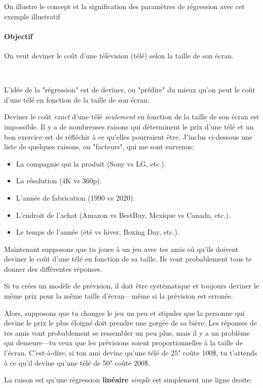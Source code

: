 \documentclass[10pt, french]{article}
\begin{document}
\begin{multicols*}{2}
On illustre le concept et la signification des paramètres de régression avec cet exemple illustratif

\paragraph{Objectif}	On veut deviner le coût d'une télévision (télé) selon la taille de son écran.

\

L'idée de la "régression" est de deviner, ou "prédire" du mieux qu'on peut le coût d'une télé en fonction de la taille de son écran.

Deviner le coût \textit{exact} d'une télé \textit{seulement} en fonction de la taille de son écran est impossible. Il y a de nombreuses raisons qui déterminent le prix d'une télé et un bon exercice est de réfléchir à ce qu'elles pourraient être. 
J'inclus ci-dessous une liste de quelques raisons, ou "facteurs", qui me sont survenus:
\begin{itemize}[leftmargin = *]
	\item	La compagnie qui la produit (Sony vs LG, etc.).
	\item	La résolution (4K vs 360p).
	\item	L'année de fabrication (1990 vs 2020).
	\item	L'endroit de l'achat (Amazon vs BestBuy, Mexique vs Canada, etc.).
	\item	Le temps de l'année (été vs hiver, Boxing Day, etc.).
\end{itemize}

Maintenant supposons que tu joues à un jeu avec tes amis où qu'ils doivent deviner le coût d'une télé en fonction de sa taille. Ils vont probablement tous te donner des différentes réponses.

Si tu crées un modèle de prévision, il doit être systématique et toujours deviner le même prix pour la même taille d'écran---même si la prévision est erronée. 

Alors, supposons que tu changes le jeu un peu et stipules que la personne qui devine le prix le plus éloigné doit prendre une gorgée de sa bière. Les réponses de tes amis vont probablement se ressembler un peu plus, mais il y a un problème qui demeure---tu veux que les prévisions soient proportionnelles à la taille de l'écran. C'est-à-dire, si ton ami devine qu'une télé de 25" coûte 100\$, tu t'attends à ce qu'il devine qu'une télé de 50" coûte 200\$.

La raison est qu'une régression \textbf{linéaire} \textit{simple} est simplement une ligne droite:
\begin{center}


\end{center}
\end{multicols*}
\end{document}

